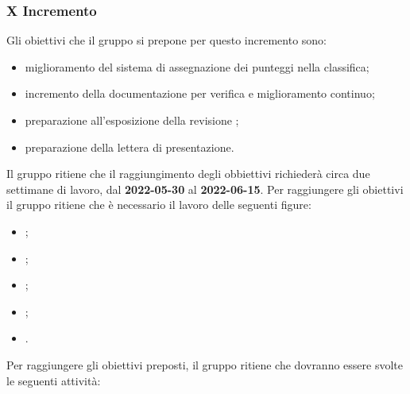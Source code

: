 
\subsubsection{X Incremento}
Gli obiettivi che il gruppo si prepone per questo incremento sono:
\begin{itemize}
	\item miglioramento del sistema di assegnazione dei punteggi nella classifica;
  	\item incremento della documentazione per verifica e miglioramento continuo;
	  \item preparazione all’esposizione della revisione \CA{};
  	\item preparazione della lettera di presentazione.
\end{itemize}
Il gruppo ritiene che il raggiungimento degli obbiettivi richiederà circa due settimane di lavoro, dal \textbf{2022-05-30} al \textbf{2022-06-15}.
Per raggiungere gli obiettivi il gruppo ritiene che è necessario il lavoro delle seguenti figure:
\begin{itemize}
	\item \RE{};
 	\item \AM{};
   	\item \PT{};
    \item \PR{};
   	\item \VE{}.
\end{itemize}
Per raggiungere gli obiettivi preposti, il gruppo ritiene che dovranno essere svolte le seguenti attività:
